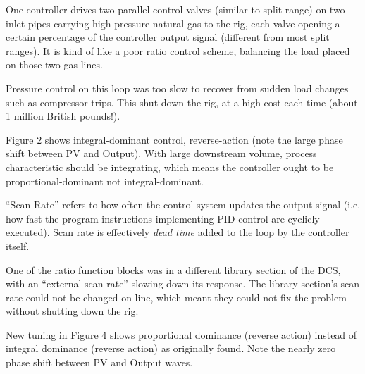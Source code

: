 












One controller drives two parallel control valves (similar to split-range) on two inlet pipes carrying high-pressure natural gas to the rig, each valve opening a certain percentage of the controller output signal (different from most split ranges).  It is kind of like a poor ratio control scheme, balancing the load placed on those two gas lines.

\vskip 10pt

Pressure control on this loop was too slow to recover from sudden load changes such as compressor trips.  This shut down the rig, at a high cost each time (about 1 million British pounds!).

\vskip 10pt

Figure 2 shows integral-dominant control, reverse-action (note the large phase shift between PV and Output).  With large downstream volume, process characteristic should be integrating, which means the controller ought to be proportional-dominant not integral-dominant.

\vskip 10pt

``Scan Rate'' refers to how often the control system updates the output signal (i.e. how fast the program instructions implementing PID control are cyclicly executed).  Scan rate is effectively {\it dead time} added to the loop by the controller itself.

\vskip 10pt

One of the ratio function blocks was in a different library section of the DCS, with an ``external scan rate'' slowing down its response.  The library section's scan rate could not be changed on-line, which meant they could not fix the problem without shutting down the rig.

\vskip 10pt

New tuning in Figure 4 shows proportional dominance (reverse action) instead of integral dominance (reverse action) as originally found.  Note the nearly zero phase shift between PV and Output waves.
















